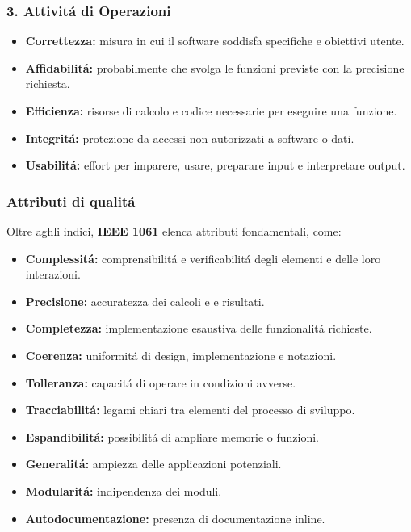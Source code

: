 \documentclass[11pt]{article}
\begin{document}
\subsubsection{3. Attivitá di Operazioni}
\label{sec:org1550b6b}
\begin{itemize}
\item \textbf{\textbf{Correttezza:}} misura in cui il software soddisfa specifiche e obiettivi utente.
\item \textbf{\textbf{Affidabilitá:}} probabilmente che svolga le funzioni previste con la precisione richiesta.
\item \textbf{\textbf{Efficienza:}} risorse di calcolo e codice necessarie per eseguire una funzione.
\item \textbf{\textbf{Integritá:}} protezione da accessi non autorizzati a software o dati.
\item \textbf{\textbf{Usabilitá:}} effort per imparere, usare, preparare input e interpretare output.
\end{itemize}
\subsubsection{Attributi di qualitá}
\label{sec:org12ff2d6}
Oltre aghli indici, \textbf{\textbf{IEEE 1061}} elenca attributi fondamentali, come:
\begin{itemize}
\item \textbf{\textbf{Complessitá:}} comprensibilitá e verificabilitá degli elementi e delle loro interazioni.
\item \textbf{\textbf{Precisione:}} accuratezza dei calcoli e e risultati.
\item \textbf{\textbf{Completezza:}} implementazione esaustiva delle funzionalitá richieste.
\item \textbf{\textbf{Coerenza:}} uniformitá di design, implementazione e notazioni.
\item \textbf{\textbf{Tolleranza:}} capacitá di operare in condizioni avverse.
\item \textbf{\textbf{Tracciabilitá:}} legami chiari tra elementi del processo di sviluppo.
\item \textbf{\textbf{Espandibilitá:}} possibilitá di ampliare memorie o funzioni.
\item \textbf{\textbf{Generalitá:}} ampiezza delle applicazioni potenziali.
\item \textbf{\textbf{Modularitá:}} indipendenza dei moduli.
\item \textbf{\textbf{Autodocumentazione:}} presenza di documentazione inline.
\end{itemize}
\end{document}
